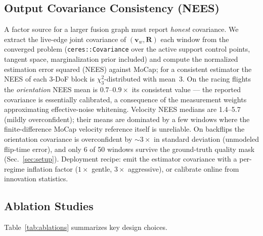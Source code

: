 \documentclass[conference]{IEEEtran}
\newcommand{\vR}{\mathbf{R}}
\newcommand{\vv}{\mathbf{v}}
\begin{document}
\subsection{Output Covariance Consistency (NEES)}
\label{sec:nees}
A factor source for a larger fusion graph must report \emph{honest}
covariance.  We extract the live-edge joint covariance of
$(\vv_w, \vR)$ each window from the converged problem
(\texttt{ceres::Covariance} over the active support control points,
tangent space, marginalization prior included) and compute the
normalized estimation error squared (NEES) against MoCap;
for a consistent estimator the NEES of each 3-DoF block is
$\chi^2_3$-distributed with mean~3.
On the racing flights the \emph{orientation} NEES mean is
$0.7$--$0.9{\times}$ its consistent value --- the reported covariance
is essentially calibrated, a consequence of the measurement weights
approximating effective-noise whitening.  Velocity NEES medians are
1.4--5.7 (mildly overconfident); their means are dominated by a few
windows where the finite-difference MoCap velocity reference itself
is unreliable.  On backflips the orientation covariance is
overconfident by ${\sim}3\times$ in standard deviation (unmodeled
flip-time error), and only 6 of 50 windows survive the ground-truth
quality mask (Sec.~\ref{sec:setup}).  Deployment recipe: emit the
estimator covariance with a per-regime inflation factor
($1\times$ gentle, $3\times$ aggressive), or calibrate online from
innovation statistics.

\subsection{Ablation Studies}
Table~\ref{tab:ablations} summarizes key design choices.
\end{document}
